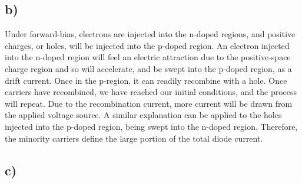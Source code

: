 \subsection*{b)}
	Under forward-bias, electrons are injected into the n-doped regions, and positive charges, or holes, 
	will be injected into the p-doped region. An electron injected into the n-doped region will feel an electric attraction due to the positive-space charge region and so will accelerate, and be swept into the p-doped region, as a drift current. Once in the p-region, it can readily recombine with a hole. Once carriers have recombined, we have reached our initial conditions, and the process will repeat. Due to the recombination current, more current will be drawn from the applied voltage source. A similar explanation can be applied to the holes injected into the p-doped region, being swept into the n-doped region. Therefore, the minority carriers define the large portion of the total diode current.
\subsection*{c)}
	
